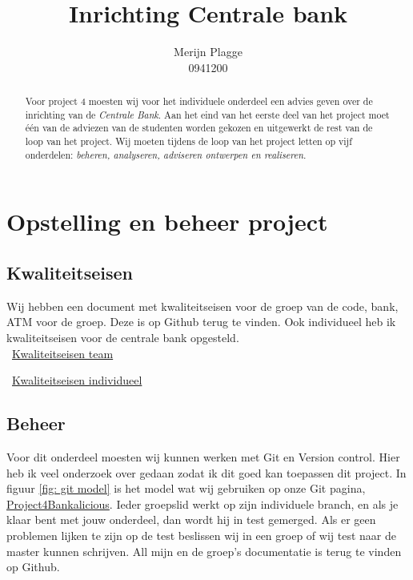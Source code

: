 \documentclass{article}
\begin{document}
\title{\huge{Inrichting Centrale bank} }
\author{Merijn Plagge \\ 0941200}

\maketitle

\begin{abstract}

Voor project 4 moesten wij voor het individuele onderdeel een advies geven over de inrichting van de \emph{Centrale Bank}.
Aan het eind van het eerste deel van het project moet \'e\'en van de adviezen van de studenten worden gekozen en uitgewerkt de rest van de loop van het project.
Wij moeten tijdens de loop van het project letten op vijf onderdelen: \emph{beheren, analyseren, adviseren ontwerpen en realiseren.}

\end{abstract}

\newpage

\tableofcontents

\newpage

\section{Opstelling en beheer project}

\subsection{Kwaliteitseisen}

Wij hebben een document met kwaliteitseisen voor de groep van de code, bank, ATM voor de groep.
Deze is op Github terug te vinden.
Ook individueel heb ik kwaliteitseisen voor de centrale bank opgesteld. \\

\vspace{1mm}
\Mundus~\href{https://github.com/Gewad/Project4Bankalicious/blob/test/eisenlijstje.pdf}{Kwaliteitseisen team}

\Mundus~\href{https://github.com/Gewad/Project4Bankalicious/blob/merijn-branch/opdrachten/kwaliteitseisen/merijn/*.pdf}{Kwaliteitseisen individueel}

\subsection{Beheer}

Voor dit onderdeel moesten wij kunnen werken met Git en Version control.
Hier heb ik veel onderzoek over gedaan zodat ik dit goed kan toepassen dit project.
In figuur \ref{fig: git model} is het model wat wij gebruiken op onze Git pagina, \href{https://github.com/Gewad/Project4Bankalicious}{Project4Bankalicious}.
Ieder groepslid werkt op zijn individuele branch, en als je klaar bent met jouw onderdeel, dan wordt hij in test gemerged.
Als er geen problemen lijken te zijn op de test beslissen wij in een groep of wij test naar de master kunnen schrijven.
All mijn en de groep's documentatie is terug te vinden op Github.
\end{document}
